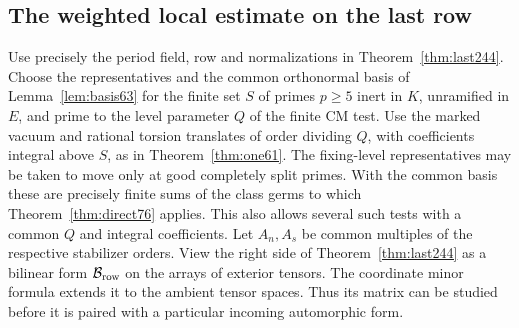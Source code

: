 \documentclass[a4paper,11pt]{article}
\theoremstyle{definition}
\theoremstyle{remark}
\numberwithin{equation}{section}
\begin{document}
\subsection{The weighted local estimate on the last row}\label{nav:IX-33}
Use precisely the period field, row and normalizations in
Theorem~\ref{thm:last244}. Choose the representatives and the
common orthonormal basis of Lemma~\ref{lem:basis63} for the
finite set \(S\) of primes \(p\ge5\) inert in \(K\), unramified
in \(E\), and prime to the level parameter \(Q\) of the finite
CM test. Use the marked vacuum and rational torsion translates of
order dividing \(Q\), with coefficients integral above \(S\), as
in Theorem~\ref{thm:one61}. The fixing-level representatives may
be taken to move only at good completely split primes. With the
common basis these are precisely finite sums of the class germs
to which Theorem~\ref{thm:direct76} applies. This also allows
several such tests with a common \(Q\) and integral coefficients.
Let \(A_n,A_s\) be common multiples of the respective stabilizer
orders. View the right side of Theorem~\ref{thm:last244} as a
bilinear form \(\mathcal B_{\rm row}\) on the arrays of exterior tensors.
The coordinate minor formula extends it to the ambient tensor
spaces. Thus its matrix can be studied before it is paired with
a particular incoming automorphic form.
\end{document}
